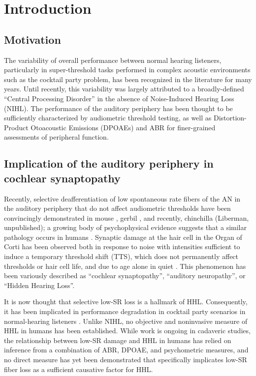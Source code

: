 \chapter{Introduction}
\label{chapter:Introduction}
\thispagestyle{myheadings}
\section{Motivation}
The variability of overall performance between normal hearing listeners, particularly in super-threshold tasks performed in complex acoustic environments such as the cocktail party problem, has been recognized in the literature for many years.  Until recently, this variability was largely attributed to a broadly-defined ``Central Processing Disorder'' in the absence of Noise-Induced Hearing Loss (NIHL). The performance of the auditory periphery has been thought to be sufficiently characterized by audiometric threshold testing, as well as Distortion-Product Otoacoustic Emissions (DPOAEs) and ABR for finer-grained assessments of peripheral function.

\section{Implication of the auditory periphery in cochlear synaptopathy}
Recently, selective deafferentiation of low spontaneous rate fibers of the AN in the auditory periphery that do not affect audiometric thresholds have been convincingly demonstrated in mouse \citep{Kujawa2009Adding}, gerbil \citep{Furman2013NoiseInduced}, and recently, chinchilla (Liberman, unpublished); a growing body of psychophysical evidence suggests that a similar pathology occurs in humans \citep{Bharadwaj2015Individual}.  Synaptic damage at the hair cell in the Organ of Corti has been observed both in response to noise with intensities sufficient to induce a temporary threshold shift (TTS), which does not permanently affect thresholds or hair cell life, and due to age alone in quiet \citep{Sergeyenko2013AgeRelated,Fernandez2015Aging}. This phenomenon has been variously described as ``cochlear synaptopathy''\citep{Bharadwaj2014Cochlear}, ``auditory neuropathy'', or ``Hidden Hearing Loss''.  

It is now thought that selective low-SR loss is a hallmark of HHL. Consequently, it has been implicated in performance degradation in cocktail party scenarios in normal-hearing listeners \citep{Bharadwaj2015Individual,Bharadwaj2014Cochlear}.  Unlike NIHL, no objective and noninvasive measure of HHL in humans has been established.  While work is ongoing in cadaveric studies, the relationship between low-SR damage and HHL in humans has relied on inference from a combination of ABR, DPOAE, and psychometric measures, and no direct measure has yet been demonstrated that specifically implicates low-SR fiber loss as a sufficient causative factor for HHL.

